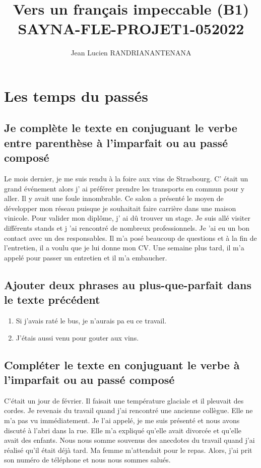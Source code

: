 \documentclass[12pt]{article}
\author{Jean Lucien RANDRIANANTENANA}
\title{Vers un français
impeccable (B1)\\SAYNA-FLE-PROJET1-052022}
\newcommand{\bleu}[1]{{\color{blue}#1}}
\begin{document}
\maketitle
\tableofcontents
\newpage
\section{Les temps du passés}
\subsection{Je complète le texte en conjuguant le verbe entre parenthèse à l'imparfait ou au passé composé}
Le mois dernier, je \bleu{me suis rendu} à la foire aux vins de Strasbourg. C\bleu{' était} un grand événement
alors j\bleu{' ai préférer} prendre les transports en commun pour y aller. Il y \bleu{avait} une foule
innombrable. Ce salon  \bleu{a présenté} le moyen de développer mon réseau puisque je \bleu{souhaitait} faire carrière dans une maison vinicole.
Pour valider mon diplôme, j\bleu{' ai dû} trouver un stage. Je \bleu{suis allé} visiter différents stands et j
\bleu{'ai rencontré} de nombreux professionnels. Je \bleu{'ai eu} un bon contact avec un des responsables.
Il m'\bleu{a posé} beaucoup de questions et à la fin de l’entretien, il \bleu{a voulu} que je lui donne mon
CV. Une semaine plus tard, il m'\bleu{a appelé} pour passer un entretien et il m'\bleu{a embaucher}.
\subsection{Ajouter deux phrases au plus-que-parfait dans le texte précédent}
\begin{enumerate}
	\item  Si j'avais raté le bus, je n'aurais pa eu ce travail.
	\item J'étais aussi venu pour gouter aux vins.
\end{enumerate}

\subsection{Compléter le texte en conjuguant le verbe à l’imparfait ou au passé composé}

C'\bleu{était} un jour de février. Il \bleu{faisait} une température glaciale et il \bleu{pleuvait} des cordes.
Je \bleu{revenais} du travail quand j'\bleu{ai rencontré} une ancienne collègue. Elle \bleu{ne m'a pas vu} immédiatement.
Je \bleu{l'ai appelé}, je \bleu{me suis présenté} et nous \bleu{avons discuté} à l’abri dans la rue.
Elle \bleu{m'a expliqué} qu’elle \bleu{avait} divorcée et qu’elle \bleu{avait} des enfants. Nous \bleu{nous somme souvenus} des anecdotes du travail quand j'\bleu{ai réalisé} qu’il \bleu{était} déjà tard.
Ma femme m'\bleu{attendait} pour le repas. Alors, j\bleu{'ai prit} son numéro de téléphone et nous \bleu{nous sommes salués}.
\end{document}
